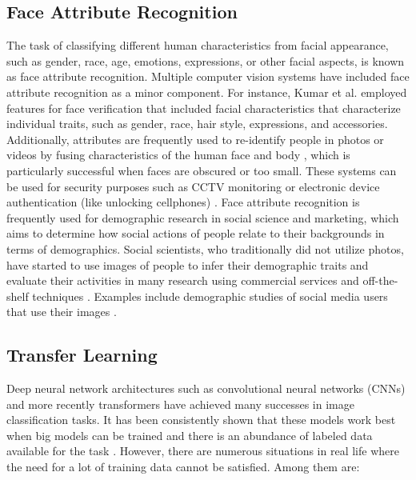 \documentclass[DIV=calc, paper=a4, fontsize=10pt, twocolumn]{article}
\begin{document}
	\subsection{Face Attribute Recognition} 
	The task of classifying different human characteristics from facial appearance, such as gender, race, age, emotions, expressions, or other facial aspects, is known as face attribute recognition. Multiple computer vision systems have included face attribute recognition as a minor component. For instance, Kumar et al. \cite{kumar2011describable} employed features for face verification that included facial characteristics that characterize individual traits, such as gender, race, hair style, expressions, and accessories. Additionally, attributes are frequently used to re-identify people in photos or videos by fusing characteristics of the human face and body \cite{layne2012person, li2014clothing, su2017multi}, which is particularly successful when faces are obscured or too small. These systems can be used for security purposes such as CCTV monitoring or electronic device authentication (like unlocking cellphones) \cite{grgic2011scface}. Face attribute recognition is frequently used for demographic research in social science and marketing, which aims to determine how social actions of people relate to their backgrounds in terms of demographics. Social scientists, who traditionally did not utilize photos, have started to use images of people to infer their demographic traits and evaluate their activities in many research using commercial services and off-the-shelf techniques \cite{amos2016openface, baltrusaitis2018openface}. Examples include demographic studies of social media users that use their images \cite{chakraborty2017makes, reis2017demographics, wang2017polarized, won2017protest, xi2020understanding}.
	
	\subsection{Transfer Learning} 
	
	Deep neural network architectures such as convolutional neural networks (CNNs) and more recently transformers have achieved many successes in image classification tasks. It has been consistently shown that these models work best when big models can be trained and there is an abundance of labeled data available for the task \cite{kolesnikov2020big, mahajan2018exploring, ngiam2018domain}. However, there are numerous situations in real life where the need for a lot of training data cannot be satisfied. Among them are:
	
\end{document}
